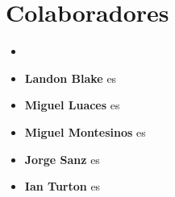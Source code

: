  \chapter*{Colaboradores}
 
 \vspace{1.5cm}
 
 
\begin{itemize}
	\item 

 
 \item \textbf{Landon Blake} es
 
 \item \textbf{Miguel Luaces} es
 
 \item \textbf{Miguel Montesinos} es
 
 \item \textbf{Jorge Sanz} es
 
 \item \textbf{Ian Turton} es
 
 
 
 
 

\end{itemize}